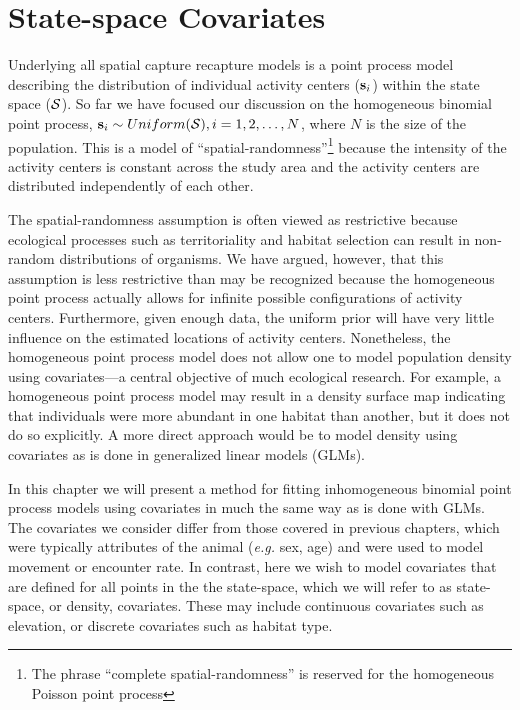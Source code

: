


\chapter{State-space Covariates}
\label{chapt.state-space}

\vspace{0.3cm}

Underlying all spatial capture recapture models is a point process
model describing the distribution of individual activity
centers (${\bf s}_i$) within the state space ($\cal{S}$). So far we have focused our
discussion on the homogeneous binomial point process,
${\bf s}_i \sim Uniform({\cal S}), i=1,2,\dots,N$, where $N$ is the
size of the population. This is a model of
``spatial-randomness''\footnote{The phrase ``complete
  spatial-randomness'' is reserved for the homogeneous Poisson point
  process}
because the intensity of the
activity centers is constant across the study area and the activity
centers are distributed independently of each other.

The spatial-randomness assumption is often viewed as restrictive
because ecological processes such as
territoriality and habitat selection can result in non-random
distributions of organisms. We have argued, however, that this
assumption is less restrictive than may be recognized because the
homogeneous point process actually allows for infinite
possible configurations of activity centers. Furthermore, given enough data,
the uniform prior will have very little influence on the estimated
locations of activity centers. Nonetheless, the homogeneous point
process model does not allow one to model population density using
covariates---a central objective of much ecological research.
For example, a homogeneous point process model
may result in a density surface map indicating that individuals were
more abundant in one habitat than another, but it does not do so
explicitly. A more direct approach would be to model density using
covariates as is done in generalized linear models (GLMs).%

In this chapter we will present a method
for fitting inhomogeneous binomial point process models using
covariates in much the same way as is done with GLMs. The
covariates we consider differ
from those covered in previous chapters, which were typically
attributes of the animal ({\it e.g.} sex, age) and were used to model movement or encounter
rate. In contrast, here we wish to
model covariates that are defined for all points in the
the state-space, which we will refer to as
state-space, or density, covariates. These may
include continuous covariates such as elevation, or discrete
covariates such as habitat type.

